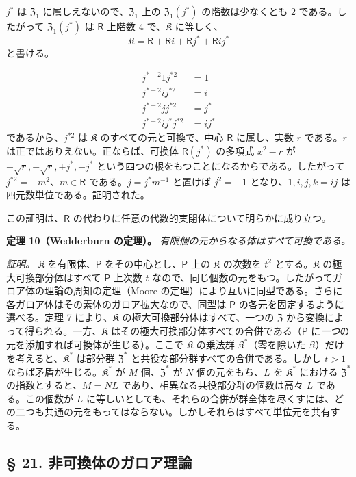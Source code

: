$j^*$ は $\mathfrak Z_1$ に属しえないので、$\mathfrak Z_1$ 上の $\mathfrak Z_1(j^*)$ の階数は少なくとも $2$ である。したがって $\mathfrak Z_1(j^*)$ は $\mathsf{R}$ 上階数 $4$ で、$\mathfrak K$ に等しく、
\[
\mathfrak K=\mathsf R+\mathsf Ri+\mathsf Rj^*+\mathsf Rij^*
\]
と書ける。

\[
\begin{aligned}
j^{*-2}1j^{*2}&=1\\
j^{*-2}ij^{*2}&=i\\
j^{*-2}jj^{*2}&=j^*\\
j^{*-2}ij^*j^{*2}&=ij^*
\end{aligned}
\]
であるから、$j^{*2}$ は $\mathfrak K$ のすべての元と可換で、中心 $\mathsf{R}$ に属し、実数 $r$ である。$r$ は正ではありえない。正ならば、可換体 $\mathsf{R}(j^*)$ の多項式 $x^2-r$ が $+\sqrt r,-\sqrt r,+j^*,-j^*$ という四つの根をもつことになるからである。したがって $j^{*2}=-m^2$、$m\in \mathsf{R}$ である。$j=j^*m^{-1}$ と置けば $j^2=-1$ となり、$1,i,j,k=ij$ は四元数単位である。証明された。

この証明は、$\mathsf{R}$ の代わりに任意の代数的実閉体について明らかに成り立つ。

\textbf{定理 10（Wedderburn の定理）。} \emph{有限個の元からなる体はすべて可換である。}

\emph{証明。} $\mathfrak K$ を有限体、$\mathsf P$ をその中心とし、$\mathsf P$ 上の $\mathfrak K$ の次数を $t^2$ とする。$\mathfrak K$ の極大可換部分体はすべて $\mathsf P$ 上次数 $t$ なので、同じ個数の元をもつ。したがってガロア体の理論の周知の定理（Moore の定理）により互いに同型である。さらに各ガロア体はその素体のガロア拡大なので、同型は $\mathsf P$ の各元を固定するように選べる。定理 7 により、$\mathfrak K$ の極大可換部分体はすべて、一つの $\mathfrak Z$ から変換によって得られる。一方、$\mathfrak K$ はその極大可換部分体すべての合併である（$\mathsf P$ に\emph{一つ}の元を添加すれば可換体が生じる）。ここで $\mathfrak K$ の乗法群 $\mathfrak K^*$（零を除いた $\mathfrak K$）だけを考えると、$\mathfrak K^*$ は部分群 $\mathfrak Z^*$ と共役な部分群すべての合併である。しかし $t>1$ ならば矛盾が生じる。$\mathfrak K^*$ が $M$ 個、$\mathfrak Z^*$ が $N$ 個の元をもち、$L$ を $\mathfrak K^*$ における $\mathfrak Z^*$ の指数とすると、$M=NL$ であり、相異なる共役部分群の個数は高々 $L$ である。この個数が $L$ に等しいとしても、それらの合併が群全体を尽くすには、どの二つも共通の元をもってはならない。しかしそれらはすべて単位元を共有する。

\subsection*{§ 21. 非可換体のガロア理論}\label{die-galoissche-theorie-der-nichtkommutativen-koerper}

